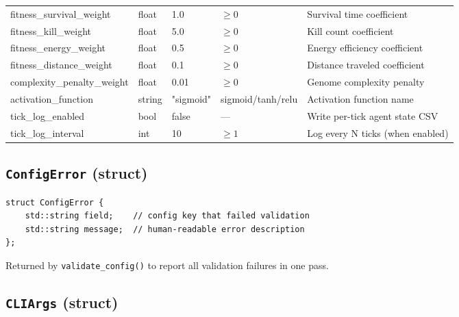 \begin{longtable}[l]{@{}>{\ttfamily\small}p{5.8cm}>{\ttfamily\small\RaggedRight}p{2.2cm}p{0.7cm}p{1.0cm}p{3.3cm}@{}}
fitness\_survival\_weight  & float & 1.0 & $\ge 0$  & Survival time coefficient \\
fitness\_kill\_weight      & float & 5.0 & $\ge 0$  & Kill count coefficient \\
fitness\_energy\_weight    & float & 0.5 & $\ge 0$  & Energy efficiency coefficient \\
fitness\_distance\_weight  & float & 0.1 & $\ge 0$  & Distance traveled coefficient \\
complexity\_penalty\_weight& float & 0.01& $\ge 0$  & Genome complexity penalty \\
activation\_function   & string & "sigmoid" & sigmoid/tanh/relu & Activation function name \\
tick\_log\_enabled     & bool   & false  & —             & Write per-tick agent state CSV \\
tick\_log\_interval    & int    & 10     & $\ge 1$       & Log every N ticks (when enabled) \\
\end{longtable}

\subsection{\texttt{ConfigError} (struct)}

\begin{lstlisting}
struct ConfigError {
    std::string field;    // config key that failed validation
    std::string message;  // human-readable error description
};
\end{lstlisting}

Returned by \texttt{validate\_config()} to report all validation failures in one pass.

\subsection{\texttt{CLIArgs} (struct)}

